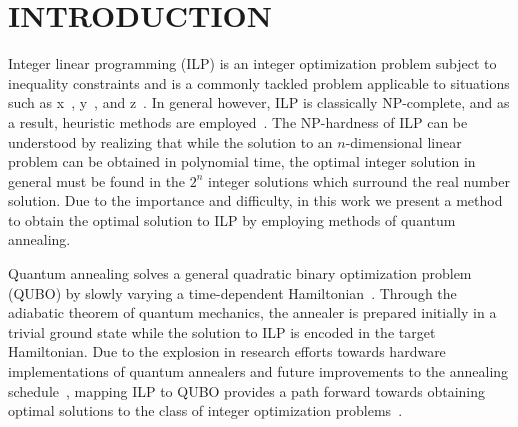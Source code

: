 \documentclass[prd,twocolumn,tightenlines,preprintnumbers,showpacs,superscriptaddress,notitlepage,nofootinbib,eqsecnum,floatfix,longbibliography]{revtex4}
\begin{document}

\maketitle
\tableofcontents

\flushbottom
\maketitle

\section{INTRODUCTION}
\label{sec:introduction}

Integer linear programming (ILP) is an integer optimization problem subject to inequality constraints and is a commonly tackled problem applicable to situations such as x~\cite{}, y~\cite{}, and z~\cite{}.
In general however, ILP is classically NP-complete, and as a result, heuristic methods are employed~\cite{}.
The NP-hardness of ILP can be understood by realizing that while the solution to an $n$-dimensional linear problem can be obtained in polynomial time, the optimal integer solution in general must be found in the $2^n$ integer solutions which surround the real number solution.
Due to the importance and difficulty, in this work we present a method to obtain the optimal solution to ILP by employing methods of quantum annealing.

Quantum annealing solves a general quadratic binary optimization problem (QUBO) by slowly varying a time-dependent Hamiltonian~\cite{}.
Through the adiabatic theorem of quantum mechanics, the annealer is prepared initially in a trivial ground state while the solution to ILP is encoded in the target Hamiltonian.
Due to the explosion in research efforts towards hardware implementations of quantum annealers and future improvements to the annealing schedule~\cite{}, mapping ILP to QUBO provides a path forward towards obtaining optimal solutions to the class of integer optimization problems~\cite{2018Glover}.
\end{document}
